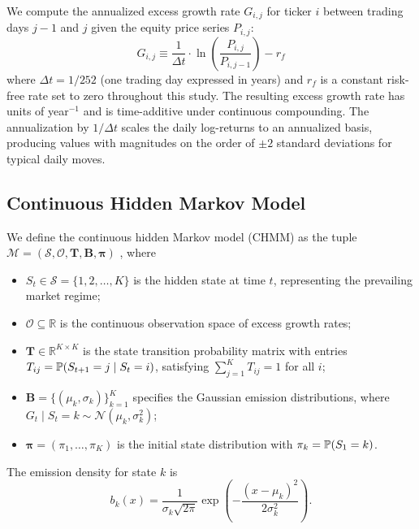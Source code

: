We compute the annualized excess growth rate $G_{i,j}$ for ticker $i$ between trading days $j-1$ and $j$ given the equity price series $P_{i,j}$:
\begin{equation}
    G_{i,j} \equiv \frac{1}{\Delta t} \cdot \ln\!\left(\frac{P_{i,j}}{P_{i,j-1}}\right) - r_f
    \label{eq:growth_rate}
\end{equation}
where $\Delta t = 1/252$ (one trading day expressed in years) and $r_f$ is a constant risk-free rate set to zero throughout this study.
The resulting excess growth rate has units of year$^{-1}$ and is time-additive under continuous compounding.
The annualization by $1/\Delta t$ scales the daily log-returns to an annualized basis, producing values with magnitudes on the order of $\pm 2$ standard deviations for typical daily moves.

\subsection{Continuous Hidden Markov Model}
\label{sec:chmm_def}

We define the continuous hidden Markov model (CHMM) as the tuple $\mathcal{M} = (\mathcal{S}, \mathcal{O}, \mathbf{T}, \mathbf{B}, \boldsymbol{\pi})$ \cite{rabiner1986introduction}, where
\begin{itemize}
    \item $S_t \in \mathcal{S} = \{1, 2, \ldots, K\}$ is the hidden state at time $t$, representing the prevailing market regime;
    \item $\mathcal{O} \subseteq \mathbb{R}$ is the continuous observation space of excess growth rates;
    \item $\mathbf{T} \in \mathbb{R}^{K \times K}$ is the state transition probability matrix with entries $T_{ij} = \mathbb{P}(S_{t+1} = j \mid S_t = i)$, satisfying $\sum_{j=1}^{K} T_{ij} = 1$ for all $i$;
    \item $\mathbf{B} = \{(\mu_k, \sigma_k)\}_{k=1}^{K}$ specifies the Gaussian emission distributions, where $G_t \mid S_t = k \sim \mathcal{N}(\mu_k, \sigma_k^2)$;
    \item $\boldsymbol{\pi} = (\pi_1, \ldots, \pi_K)$ is the initial state distribution with $\pi_k = \mathbb{P}(S_1 = k)$.
\end{itemize}

The emission density for state $k$ is
\begin{equation}
    b_k(x) = \frac{1}{\sigma_k \sqrt{2\pi}} \exp\!\left(-\frac{(x - \mu_k)^2}{2\sigma_k^2}\right).
    \label{eq:emission}
\end{equation}


